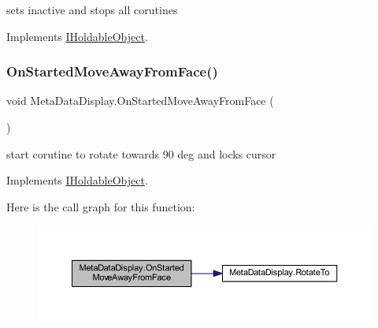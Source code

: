 sets inactive and stops all corutines 



Implements \mbox{\hyperlink{interface_i_holdable_object_abe7c5e5ed97fb5c908c91da5b8714f0e}{I\+Holdable\+Object}}.

\mbox{\label{class_meta_data_display_a98518b3d82ffd1e428cab9a2328fb018}} 
\subsubsection{\texorpdfstring{On\+Started\+Move\+Away\+From\+Face()}{OnStartedMoveAwayFromFace()}}
{\footnotesize\ttfamily void Meta\+Data\+Display.\+On\+Started\+Move\+Away\+From\+Face (\begin{DoxyParamCaption}{ }\end{DoxyParamCaption})}



start corutine to rotate towards 90 deg and locks cursor 



Implements \mbox{\hyperlink{interface_i_holdable_object_a75f802a9736db51e5e8d1568689dd11c}{I\+Holdable\+Object}}.

Here is the call graph for this function\+:\nopagebreak
\begin{figure}[H]
\begin{center}
\leavevmode
\includegraphics[width=350pt]{class_meta_data_display_a98518b3d82ffd1e428cab9a2328fb018_cgraph}
\end{center}
\end{figure}
\mbox{\label{class_meta_data_display_aa0a9b9ca8243943104c82602e69a0541}} 
